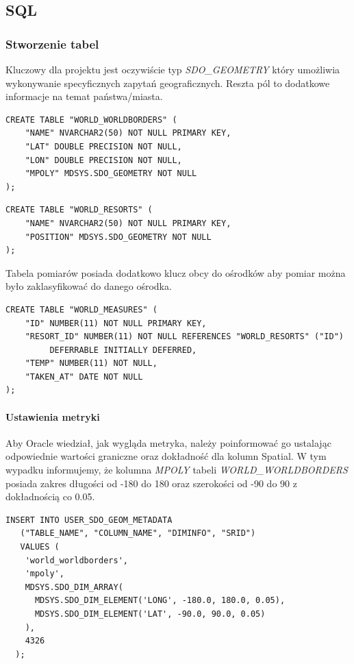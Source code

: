 \documentclass[12pt]{article}
\begin{document}
\subsection{SQL}
\subsubsection{Stworzenie tabel}
Kluczowy dla projektu jest oczywiście typ \emph{SDO\_GEOMETRY} który umożliwia wykonywanie
specyficznych zapytań geograficznych. Reszta pól to dodatkowe informacje na temat państwa/miasta.
\begin{verbatim}
CREATE TABLE "WORLD_WORLDBORDERS" (
    "NAME" NVARCHAR2(50) NOT NULL PRIMARY KEY,
    "LAT" DOUBLE PRECISION NOT NULL,
    "LON" DOUBLE PRECISION NOT NULL,
    "MPOLY" MDSYS.SDO_GEOMETRY NOT NULL
);
\end{verbatim}

\begin{verbatim}
CREATE TABLE "WORLD_RESORTS" (
    "NAME" NVARCHAR2(50) NOT NULL PRIMARY KEY,
    "POSITION" MDSYS.SDO_GEOMETRY NOT NULL
);
\end{verbatim}

Tabela pomiarów posiada dodatkowo klucz obcy do ośrodków aby pomiar można było zaklasyfikować do
danego ośrodka.
\begin{verbatim}
CREATE TABLE "WORLD_MEASURES" (
    "ID" NUMBER(11) NOT NULL PRIMARY KEY,
    "RESORT_ID" NUMBER(11) NOT NULL REFERENCES "WORLD_RESORTS" ("ID")
         DEFERRABLE INITIALLY DEFERRED,
    "TEMP" NUMBER(11) NOT NULL,
    "TAKEN_AT" DATE NOT NULL
);
\end{verbatim}

\paragraph{Ustawienia metryki}
Aby Oracle wiedział, jak wygląda metryka, należy poinformować go ustalając odpowiednie wartości graniczne
oraz dokładność dla kolumn Spatial. W tym wypadku informujemy, że kolumna \emph{MPOLY} tabeli
\emph{WORLD\_WORLDBORDERS} posiada zakres długości od -180 do 180 oraz szerokości od -90 do 90 z dokładnością
co 0.05.

\begin{verbatim}
INSERT INTO USER_SDO_GEOM_METADATA
   ("TABLE_NAME", "COLUMN_NAME", "DIMINFO", "SRID")
   VALUES (
    'world_worldborders',
    'mpoly',
    MDSYS.SDO_DIM_ARRAY(
      MDSYS.SDO_DIM_ELEMENT('LONG', -180.0, 180.0, 0.05),
      MDSYS.SDO_DIM_ELEMENT('LAT', -90.0, 90.0, 0.05)
    ),
    4326
  );
\end{verbatim}
\end{document}
